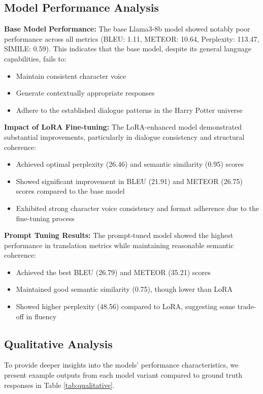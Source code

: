\documentclass{article}
\begin{document}
\subsection{Model Performance Analysis}

\textbf{Base Model Performance:}
The base Llama3-8b model showed notably poor performance across all metrics (BLEU: 1.11, METEOR: 10.64, Perplexity: 113.47, SIMILE: 0.59). This indicates that the base model, despite its general language capabilities, fails to:
\begin{itemize}
\item Maintain consistent character voice
\item Generate contextually appropriate responses
\item Adhere to the established dialogue patterns in the Harry Potter universe
\end{itemize}

\textbf{Impact of LoRA Fine-tuning:}
The LoRA-enhanced model demonstrated substantial improvements, particularly in dialogue consistency and structural coherence:
\begin{itemize}
\item Achieved optimal perplexity (26.46) and semantic similarity (0.95) scores
\item Showed significant improvement in BLEU (21.91) and METEOR (26.75) scores compared to the base model
\item Exhibited strong character voice consistency and format adherence due to the fine-tuning process
\end{itemize}

\textbf{Prompt Tuning Results:}
The prompt-tuned model showed the highest performance in translation metrics while maintaining reasonable semantic coherence:
\begin{itemize}
\item Achieved the best BLEU (26.79) and METEOR (35.21) scores
\item Maintained good semantic similarity (0.75), though lower than LoRA
\item Showed higher perplexity (48.56) compared to LoRA, suggesting some trade-off in fluency
\end{itemize}

\subsection{Qualitative Analysis}

To provide deeper insights into the models' performance characteristics, we present example outputs from each model variant compared to ground truth responses in Table \ref{tab:qualitative}.
\end{document}
